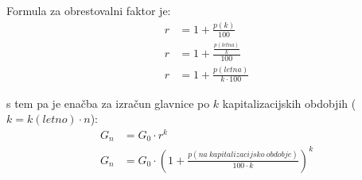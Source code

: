 \documentclass[12pt]{article}
\begin{document}
        Formula za obrestovalni faktor je:
        \begin{equation}
            \begin{split}
                r & = 1 + \frac{p(k)}{100} \\
                r & = 1 + \frac{\frac{p(letna)}{k}}{100} \\
                r & = 1 + \frac{p(letna)}{k \cdot 100}
            \end{split}
        \end{equation}

        s tem pa je enačba za izračun glavnice po $k$ kapitalizacijskih obdobjih 
        ($k = k(letno) \cdot n$):
        \begin{equation}
            \begin{split}
                G_n & = G_0 \cdot r^k \\
                G_n & = G_0 \cdot (1 + \frac{p(na \: kapitalizacijsko \: obdobje)}{100 \cdot k})^k
            \end{split}
        \end{equation}

        \quad \\
        \quad \\
\end{document}
